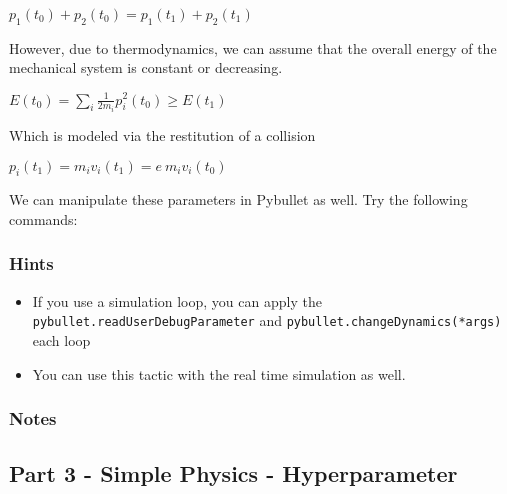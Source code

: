 \(p_1(t_0)+p_2(t_0)=p_1(t_1)+p_2(t_1)\)

However, due to thermodynamics, we can assume that the overall energy of
the mechanical system is constant or decreasing.

\(E(t_0) = \sum_i \frac{1}{2 m_i} p_i^2(t_0)\geq E(t_1)\)

Which is modeled via the restitution of a collision

\(p_i(t_1) = m_i v_i (t_1) = e ~ m_i v_i(t_0)\)

We can manipulate these parameters in Pybullet as well. Try the
following commands:

\begin{Shaded}
\begin{Highlighting}[]
\OperatorTok{*}

\OperatorTok{*}

\OperatorTok{*}
\OperatorTok{*}
\end{Highlighting}
\end{Shaded}

\hypertarget{hints-1}{%
\subsubsection{Hints}\label{hints-1}}

\begin{itemize}
\tightlist
\item
  If you use a simulation loop, you can apply the
  \texttt{pybullet.readUserDebugParameter} and
  \texttt{pybullet.changeDynamics(*args)} each loop
\item
  You can use this tactic with the real time simulation as well.
\end{itemize}

\hypertarget{notes-1}{%
\subsubsection{Notes}\label{notes-1}}

\pagebreak

\hypertarget{part-3---simple-physics---hyperparameter}{%
\subsection{Part 3 - Simple Physics -
Hyperparameter}\label{part-3---simple-physics---hyperparameter}}

